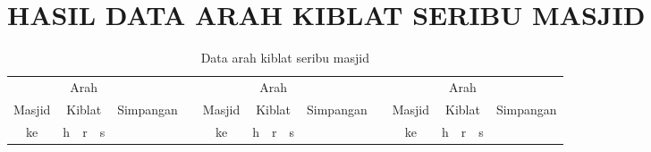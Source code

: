 
\chapter{HASIL DATA ARAH KIBLAT SERIBU MASJID}\label{cha:hasil}

\begin{table}
\caption{Data arah kiblat seribu masjid}
\tiny
\begin{tabular}{c|c|c|c|c|c|c|c|c|c|c|c|c|c|c|c|c}
\hline
& \multicolumn{3}{c|}{Arah}&&&& \multicolumn{3}{c|}{Arah}&&&& \multicolumn{3}{c|}{Arah} &\\
Masjid & \multicolumn{3}{c|}{Kiblat}& Simpangan&&Masjid & \multicolumn{3}{c|}{Kiblat}& Simpangan&&Masjid & \multicolumn{3}{c|}{Kiblat}& Simpangan\\
\cline{2-4}\cline{8-10}\cline{14-16}
ke & h & r & s & &&ke & h & r & s & &&ke & h & r & s &\\
\hline
\end{tabular}
\end{table}
